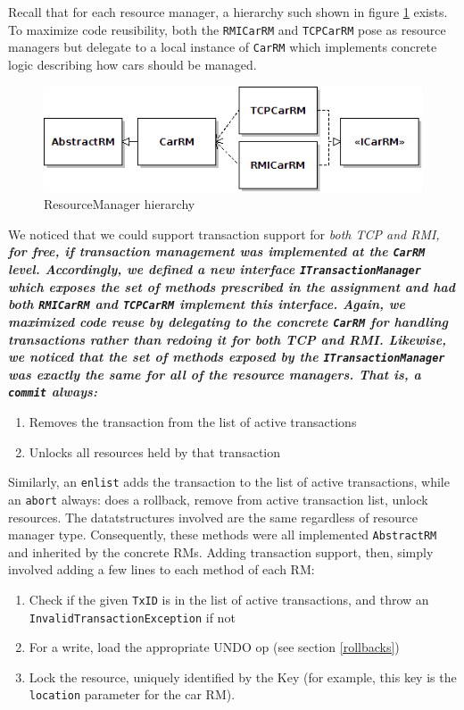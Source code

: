 \documentclass[a4paper]{article}
\begin{document}
Recall that for each resource manager, a hierarchy such shown in figure \ref{carrm} exists. To maximize code reusibility, both the \texttt{RMICarRM} and \texttt{TCPCarRM} pose as resource managers but delegate to a local instance of 
\texttt{CarRM} which implements concrete logic describing how cars should be managed. 
\begin{figure}[h!]
  \centering
	\includegraphics[scale=0.6]{carrm.png}
  \caption{ResourceManager hierarchy}
  \label{carrm}
\end{figure}
We noticed that we could support transaction support for \it both \rm TCP and RMI, \bf for free\rm, if transaction management was implemented at the \texttt{CarRM} level. Accordingly, we defined a new interface \texttt{ITransactionManager} which 
exposes the set of methods prescribed in the assignment and had both \texttt{RMICarRM} and \texttt{TCPCarRM} implement this interface. Again, we maximized code reuse by delegating to the concrete \texttt{CarRM} for handling transactions
rather than redoing it for both TCP and RMI. Likewise, we noticed that the set of methods exposed by the \texttt{ITransactionManager} was exactly the same for all of the resource managers. That is, a \texttt{commit} always:
\begin{enumerate}
 \item[1.] Removes the transaction from the list of active transactions 
 \item[2.] Unlocks all resources held by that transaction
\end{enumerate}
Similarly, an \texttt{enlist} adds the transaction to the list of active transactions, while an \texttt{abort} always: does a rollback, remove from active transaction list, unlock resources. The datatstructures involved are the same
regardless of resource manager type. Consequently, these methods were all implemented \texttt{AbstractRM} and inherited by the concrete RMs. Adding transaction support, then, simply involved adding a few lines to each method of each RM:
\begin{enumerate}
 \item[1.] Check if the given \texttt{TxID} is in the list of active transactions, and throw an \texttt{InvalidTransactionException} if not
 \item[2.] For a write, load the appropriate UNDO op (see section \ref{rollbacks})
 \item[3.] Lock the resource, uniquely identified by the Key (for example, this key is the \texttt{location} parameter for the car RM).
\end{enumerate}
\end{document}
